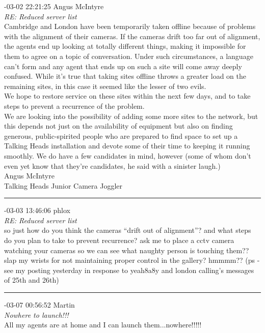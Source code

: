 \begin{mail}
{-03-02 22:21:25 Angus McIntyre}\\
{\itshape RE: Reduced server list}\\
Cambridge and London have been temporarily taken offline because of problems with the alignment of their cameras. If the cameras drift too far out of alignment, the agents end up looking at totally different things, making it impossible for them to agree on a topic of conversation. Under such circumstances, a language can't form and any agent that ends up on such a site will come away deeply confused. While it's true that taking sites offline throws a greater load on the remaining sites, in this case it seemed like the lesser of two evils.\\
We hope to restore service on these sites within the next few days, and to take steps to prevent a recurrence of the problem.\\
We are looking into the possibility of adding some more sites to the network, but this depends not just on the availability of equipment but also on finding generous, public-spirited people who are prepared to find space to set up a Talking Heads installation and devote some of their time to keeping it running smoothly. We do have a few candidates in mind, however (some of whom don't even yet know that they're candidates, he said with a sinister laugh.) \\
    Angus McIntyre\\
    Talking Heads Junior Camera Joggler\\

\rule{0.8\textwidth}{.4pt}

{-03-03 13:46:06 phlox}\\
{\itshape RE: Reduced server list}\\
so just how do you think the cameras ``drift out of alignment''? and what steps do you plan to take to prevent recurrence? ask me to place a cctv camera watching your cameras so we can see what naughty person is touching them?? slap my wrists for not maintaining proper control in the gallery? hmmmm?? (ps - see my posting yesterday in response to yeah8a8y and london calling's messages of 25th and 26th)\\

\rule{0.8\textwidth}{.4pt}

{-03-07 00:56:52 Martin}\\
{\itshape Nowhere to launch!!!}\\
All my agents are at home and I can launch them...nowhere!!!!!\\


\end{mail}

